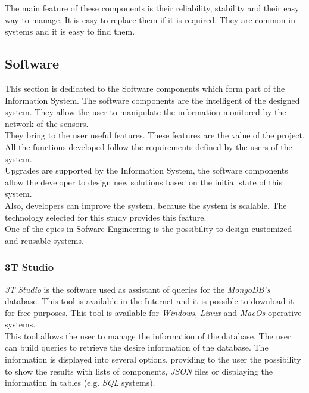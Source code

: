 The main feature of these components is their reliability, stability and their easy way to manage. It is easy to replace them if it is required. They are common in systems and it is easy to find them.

\subsection{Software}

This section is dedicated to the Software components which form part of the Information System. The software components are the intelligent of the designed system. They allow the user to manipulate the information monitored by the network of the sensors.\\

They bring to the user useful features. These features are the value of the project. All the functions developed follow the requirements defined by the users of the system.\\

Upgrades are supported by the Information System, the software components allow the developer to design new solutions based on the initial state of this system.\\

Also, developers can improve the system, because the system is scalable. The technology selected for this study provides this feature.\\

One of the epics in Sofware Engineering is the possibility to design customized and reusable systems.

\subsubsection{3T Studio}

\textit{3T Studio} is the software used as assistant of queries for the \textit{MongoDB's} database. This tool is available in the Internet and it is possible to download it for free purposes. This tool is available for \textit{Windows}, \textit{Linux} and \textit{MacOs} operative systems.\\

This tool allows the user to manage the information of the database. The user can build queries to retrieve the desire information of the database. The information is displayed into several options, providing to the user the possibility to show the results with lists of components, \textit{JSON} files or displaying the information in tables (e.g. \textit{SQL} systems).\\

